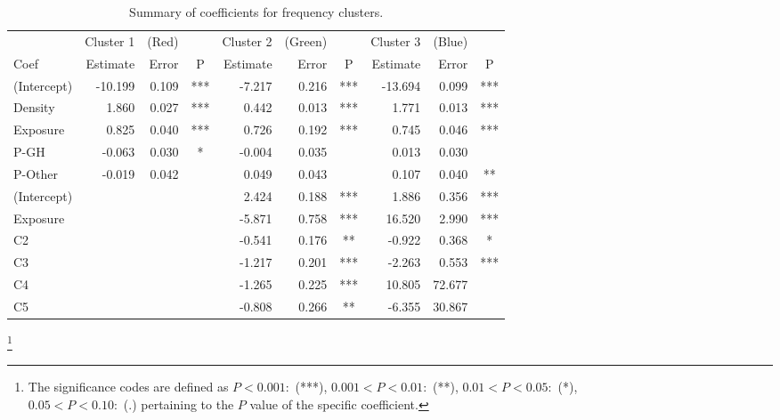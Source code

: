\documentclass[11pt,letterpaper]{article}
\numberwithin{equation}{section}
\numberwithin{equation}{section}
\numberwithin{equation}{section}
\begin{document}
\begin{center}
\begin{table}
\caption{Summary of coefficients for frequency clusters.}
\label{frequencySummary}
\begin{tabular}{|l|rrc|rrc|rrc|}
\hline\hline
          & Cluster 1 & (Red) &   & Cluster 2 & (Green) &  & Cluster 3 & (Blue) &   \\
Coef        & Estimate  & Error & P   & Estimate  & Error   & P   & Estimate  & Error  & P  \\
 \hline
(Intercept) & -10.199   & 0.109 & *** & -7.217    & 0.216   & *** & -13.694   & 0.099  & *** \\
Density     & 1.860     & 0.027 & *** & 0.442     & 0.013   & *** & 1.771     & 0.013  & *** \\
Exposure    & 0.825     & 0.040 & *** & 0.726     & 0.192   & *** & 0.745     & 0.046  & *** \\
P-GH        & -0.063    & 0.030 & *   & -0.004    & 0.035   &     & 0.013     & 0.030  &     \\
P-Other     & -0.019    & 0.042 &     & 0.049     & 0.043   &     & 0.107     & 0.040  & **  \\
\hline
(Intercept) &          &      &    & 2.424     & 0.188   & *** & 1.886     & 0.356  & *** \\
Exposure    &          &      &    & -5.871    & 0.758   & *** & 16.520    & 2.990  & *** \\
C2          &          &      &    & -0.541    & 0.176   & **  & -0.922    & 0.368  & *   \\
C3          &          &      &    & -1.217    & 0.201   & *** & -2.263    & 0.553  & *** \\
C4          &          &      &    & -1.265    & 0.225   & *** & 10.805    & 72.677 &     \\
C5          &          &      &    & -0.808    & 0.266   & **  & -6.355    & 30.867 &   \\
\hline\hline
\end{tabular}
\footnote{The significance codes are defined as $  P < 0.001 : $  (***), $0.001 < P < 0.01:$ (**), $  0.01 < P < 0.05:$ (*),\\ $0.05 < P < 0.10 : $ (.) %
pertaining to the $P$ value of the specific coefficient.}
\end{table}
\end{center}



\end{document}
